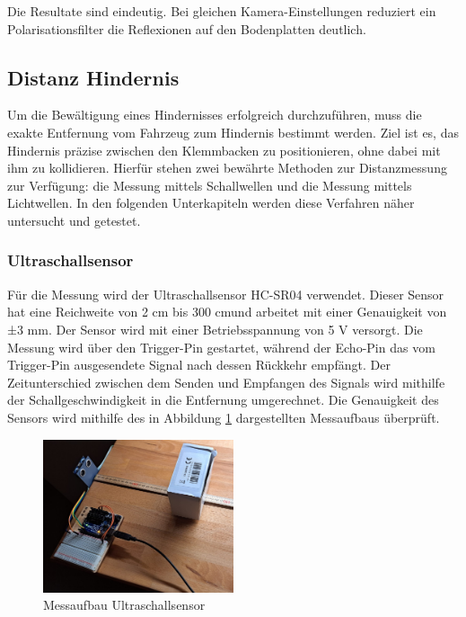 \documentclass[../main.tex]{subfiles}
\begin{document}
Die Resultate sind eindeutig. Bei gleichen Kamera-Einstellungen reduziert ein Polarisationsfilter die Reflexionen auf den Bodenplatten deutlich.
\newpage
\subsection{Distanz Hindernis} 
\label{sec:Distanz_Hindernis}
Um die Bewältigung eines Hindernisses erfolgreich durchzuführen, muss die exakte Entfernung vom Fahrzeug zum Hindernis bestimmt werden. Ziel ist es, das Hindernis präzise zwischen den Klemmbacken zu positionieren, ohne dabei mit ihm zu kollidieren. Hierfür stehen zwei bewährte Methoden zur Distanzmessung zur Verfügung: die Messung mittels Schallwellen und die Messung mittels Lichtwellen. In den folgenden Unterkapiteln werden diese Verfahren näher untersucht und getestet.

\subsubsection{Ultraschallsensor}
Für die Messung wird der Ultraschallsensor HC-SR04 verwendet. Dieser Sensor hat eine Reichweite von 2 cm bis 300 cm\footnotemark und arbeitet mit einer Genauigkeit von ±3 mm. Der Sensor wird mit einer Betriebsspannung von 5 V versorgt. Die Messung wird über den Trigger-Pin gestartet, während der Echo-Pin das vom Trigger-Pin ausgesendete Signal nach dessen Rückkehr empfängt. Der Zeitunterschied zwischen dem Senden und Empfangen des Signals wird mithilfe der Schallgeschwindigkeit in die Entfernung umgerechnet. Die Genauigkeit des Sensors wird mithilfe des in Abbildung \ref{fig:Ultraschall1} dargestellten Messaufbaus überprüft.

\begin{figure}[h] %
    \centering
    \includegraphics[width=0.5\textwidth]{img/sensortest/MA_Ultraschall.jpg} %
    \caption{Messaufbau Ultraschallsensor}
    \label{fig:Ultraschall1} %
\end{figure}
\end{document}
